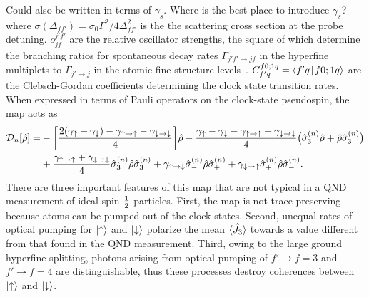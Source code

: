 \documentclass[preprint, aps,pra,onecolumn]{revtex4-1} %
\newcommand{\half}{\smallfrac{1}{2}}
\newcommand{\jz}{\hat{J}_3}
\newcommand{\gammauu}{\gamma_{\uparrow \rightarrow \uparrow}}
\newcommand{\gammadd}{\gamma_{\downarrow \rightarrow \downarrow}}
\newcommand{\gammaud}{\gamma_{\uparrow \rightarrow \downarrow}}
\newcommand{\gammadu}{\gamma_{\downarrow \rightarrow \uparrow}}
\newcommand{\gammau}{\gamma_{\uparrow}}
\newcommand{\gammad}{\gamma_{\downarrow}}
\newcommand{\comment}[1]{{\color{Maroon} #1}}
\begin{document}
\comment{Could also be written in terms of $ \gamma_s $. Where is the best place to introduce $ \gamma_s $?}
where $ \sigma (\Delta_{ff'} )  = \sigma_0 \Gamma^2/4\Delta^2_{ff'}$ is the the scattering cross section at the probe detuning. 
$ o_{jf}^{j'f'} $ are the relative oscillator strengths, the square of which determine the branching ratios for spontaneous decay rates $ \Gamma_{j'f'\rightarrow jf} $ in the hyperfine multiplets to $\Gamma_{j'\rightarrow j}  $ in the atomic fine structure levels~\cite{deutsch_quantum_2010}. 
$ C_{f'q}^{f0;1 q}=\Braket{f'q}{f0;1q} $ are the Clebsch-Gordan coefficients determining the clock state transition rates. 
When expressed in terms of Pauli operators on the clock-state pseudospin, the map acts as
	\begin{align} \label{Eq::OpticalPumpingMapSchr}
		\mathcal{D}_n [\hat{\rho}] 
				=& - \bigg[ \frac{2(\gammau+ \gammad) - \gammauu - \gammadd}{4} \bigg] \hat{\rho} - \frac{ \gammau - \gammad - \gammauu + \gammadd }{4} \big( \hat{\sigma}_3^{(n)} \hat{\rho}+ \hat{\rho} \hat{\sigma}_3^{(n)} \big) \nn \\
		&+ \frac{\gammauu+\gammadd}{4} \hat{\sigma}_ 3^{(n)}\hat{\rho} \hat{\sigma}_3^{(n)} + \gammaud  \hat{\sigma}_-^{(n)} \hat{\rho} \hat{\sigma}_+^{(n)} + \gammadu  \hat{\sigma}_+^{(n)} \hat{\rho} \hat{\sigma}_- ^{(n)}.   
	\end{align} 
There are three important features of this map that are not typical in a QND measurement of ideal spin-$\half$ particles.  
First, the map is not trace preserving because atoms can be pumped out of the clock states. 
Second, unequal rates of optical pumping for $\ket{\uparrow}$ and $\ket{\downarrow}$ polarize the mean $\expt{\jz}$ towards a value different from that found in the QND measurement. 
Third, owing to the large ground hyperfine splitting, photons arising from optical pumping of $f' \rightarrow f=3$ and $f' \rightarrow f=4$ are distinguishable, thus these processes destroy coherences between $\ket{\uparrow}$ and $\ket{\downarrow}$. 
\end{document}
